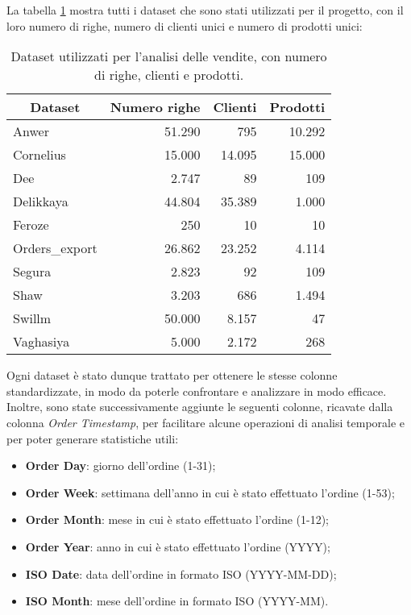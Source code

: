 La tabella \ref{tab:dataset-riassunto} mostra tutti i dataset che sono stati utilizzati per il progetto, con il loro numero di righe, numero di clienti unici e numero di prodotti unici:
\begin{table}[h]
    \centering
    \begin{tabular}{|l|r|r|r|}
        \hline
        \multicolumn{1}{|c|}{\textbf{Dataset}} & \multicolumn{1}{|c|}{\textbf{Numero righe}} & \multicolumn{1}{|c|}{\textbf{Clienti}} & \multicolumn{1}{|c|}{\textbf{Prodotti}} \\
        \hline
        Anwer          & 51.290 & 795   & 10.292 \\
        Cornelius      & 15.000 & 14.095 & 15.000 \\
        Dee            & 2.747  & 89    & 109 \\
        Delikkaya      & 44.804 & 35.389 & 1.000 \\
        Feroze         & 250   & 10    & 10 \\
        Orders\_export & 26.862 & 23.252 & 4.114 \\
        Segura         & 2.823  & 92    & 109 \\
        Shaw           & 3.203  & 686   & 1.494 \\
        Swillm         & 50.000 & 8.157  & 47 \\
        Vaghasiya      & 5.000  & 2.172  & 268 \\
        \hline
    \end{tabular}
    \caption{Dataset utilizzati per l'analisi delle vendite, con numero di righe, clienti e prodotti.}
    \label{tab:dataset-riassunto}
\end{table}

Ogni dataset è stato dunque trattato per ottenere le stesse colonne standardizzate, in modo da poterle confrontare e analizzare in modo efficace.
Inoltre, sono state successivamente aggiunte le seguenti colonne, ricavate dalla colonna \emph{Order Timestamp}, per facilitare alcune operazioni di analisi temporale e per poter generare statistiche utili:
\begin{itemize}
    \item \textbf{Order Day}: giorno dell'ordine (1-31);
    \item \textbf{Order Week}: settimana dell'anno in cui è stato effettuato l'ordine (1-53);
    \item \textbf{Order Month}: mese in cui è stato effettuato l'ordine (1-12);
    \item \textbf{Order Year}: anno in cui è stato effettuato l'ordine (YYYY);
    \item \textbf{ISO Date}: data dell'ordine in formato ISO (YYYY-MM-DD);
    \item \textbf{ISO Month}: mese dell'ordine in formato ISO (YYYY-MM).
\end{itemize}


